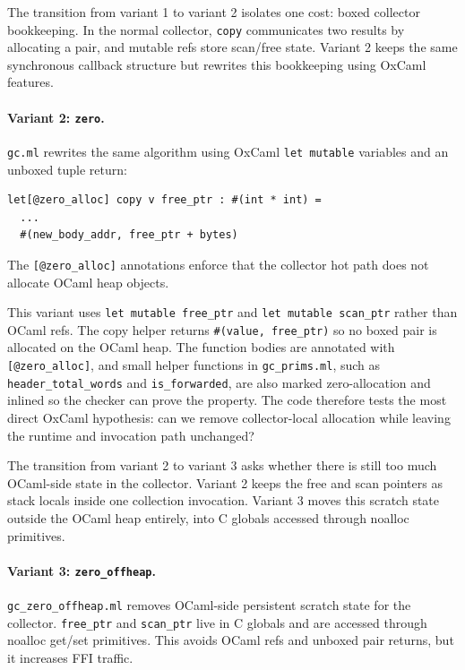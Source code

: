 \documentclass[11pt,a4paper]{article}
\begin{document}
The transition from variant 1 to variant 2 isolates one cost: boxed collector
bookkeeping.  In the normal collector, \texttt{copy} communicates two results by
allocating a pair, and mutable refs store scan/free state.  Variant 2 keeps the
same synchronous callback structure but rewrites this bookkeeping using OxCaml
features.

\paragraph{Variant 2: \texttt{zero}.}
\texttt{gc.ml} rewrites the same algorithm using OxCaml \texttt{let mutable}
variables and an unboxed tuple return:
\begin{lstlisting}[caption={Allocation-free copy return shape.},label={lst:unboxed}]
let[@zero_alloc] copy v free_ptr : #(int * int) =
  ...
  #(new_body_addr, free_ptr + bytes)
\end{lstlisting}
The \texttt{[@zero\_alloc]} annotations enforce that the collector hot path does
not allocate OCaml heap objects.

This variant uses \texttt{let mutable free\_ptr} and \texttt{let mutable
scan\_ptr} rather than OCaml refs.  The copy helper returns
\texttt{\#(value, free\_ptr)} so no boxed pair is allocated on the OCaml heap.
The function bodies are annotated with \texttt{[@zero\_alloc]}, and small helper
functions in \texttt{gc\_prims.ml}, such as \texttt{header\_total\_words} and
\texttt{is\_forwarded}, are also marked zero-allocation and inlined so the
checker can prove the property.  The code therefore tests the most direct
OxCaml hypothesis: can we remove collector-local allocation while leaving the
runtime and invocation path unchanged?

The transition from variant 2 to variant 3 asks whether there is still too much
OCaml-side state in the collector.  Variant 2 keeps the free and scan pointers
as stack locals inside one collection invocation.  Variant 3 moves this scratch
state outside the OCaml heap entirely, into C globals accessed through noalloc
primitives.

\paragraph{Variant 3: \texttt{zero\_offheap}.}
\texttt{gc\_zero\_offheap.ml} removes OCaml-side persistent scratch state for
the collector.  \texttt{free\_ptr} and \texttt{scan\_ptr} live in C globals and
are accessed through noalloc get/set primitives.  This avoids OCaml refs and
unboxed pair returns, but it increases FFI traffic.
\end{document}
